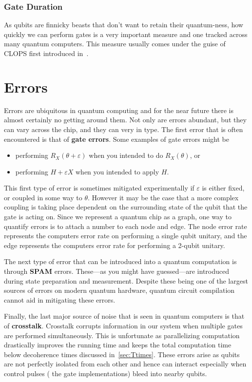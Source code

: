 \subsubsection{Gate Duration}

As qubits are finnicky beasts that don't want to retain their quantum-ness, how quickly we can perform gates is a very important measure and one tracked across many quantum computers.
This measure usually comes under the guise of \ac{CLOPS} first introduced in~\cite{clops}. %

\section{Errors}\label{sec:errors}

Errors are ubiquitous in quantum computing and for the near future there is almost certainly no getting around them.
Not only are errors abundant, but they can vary across the chip, and they can very in type.
The first error that is often encountered is that of \textbf{gate errors}.
Some examples of gate errors might be
\begin{itemize}
    \item performing $R_X(\theta + \varepsilon)$ when you intended to do $R_X(\theta)$, or
    \item performing $H + \varepsilon X$ when you intended to apply $H$.
\end{itemize}
This first type of error is sometimes mitigated experimentally if $\varepsilon$ is either fixed, or coupled in some way to $\theta$.
However it may be the case that a more complex coupling is taking place dependent on the surrounding state of the qubit that the gate is acting on.
Since we represent a quantum chip as a graph, one way to quantify errors is to attach a number to each node and edge.
The node error rate represents the computers error rate on performing a single qubit unitary, and the edge represents the computers error rate for performing a 2-qubit unitary.

The next type of error that can be introduced into a quantum computation is through \textbf{\ac{SPAM}} errors. %
These---as you might have guessed---are introduced during state preparation and measurement.
Despite these being one of the largest sources of errors on modern quantum hardware, quantum circuit compilation cannot aid in mitigating these errors.

Finally, the last major source of noise that is seen in quantum computers is that of \textbf{crosstalk}.
Crosstalk corrupts information in our system when multiple gates are performed simultaneously.
This is unfortunate as parallelizing computation drastically improves the running time and keeps the total computation time below decoherence times discussed in~\cref{sec:Ttimes}.
These errors arise as qubits are not perfectly isolated from each other and hence can interact especially when control pulses (\ie{} the gate implementations) bleed into nearby qubits.
